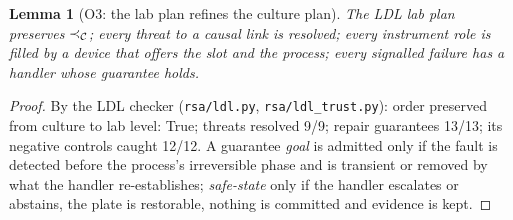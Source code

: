 \documentclass[10pt,a4paper]{article}
\theoremstyle{plain}\newtheorem{theorem}{Theorem}\newtheorem{lemma}{Lemma}\newtheorem{corollary}{Corollary}
\theoremstyle{definition}\newtheorem{definition}{Definition}\newtheorem{assumption}{Assumption}
\theoremstyle{remark}\newtheorem*{remark}{Remark}
\begin{document}
\begin{lemma}[O3: the lab plan refines the culture plan]
The LDL lab plan preserves $\prec_{\mathcal{C}}$; every threat to a causal link is resolved; every instrument role is filled by a
device that offers the slot and the process; every signalled failure has a handler whose guarantee holds.
\end{lemma}
\begin{proof}
By the LDL checker (\texttt{rsa/ldl.py}, \texttt{rsa/ldl\_trust.py}): order preserved from culture to lab level: True; threats resolved 9/9; repair guarantees 13/13; its negative controls caught 12/12. A guarantee \textit{goal} is admitted only if the fault is detected before the process's irreversible phase and is transient or removed by what the handler re-establishes; \textit{safe-state} only if the handler escalates or abstains, the plate is restorable, nothing is committed and evidence is kept.
\end{proof}
\end{document}
